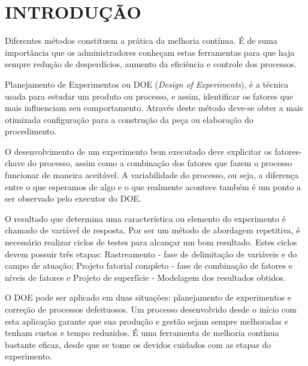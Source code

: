 \chapter{INTRODUÇÃO}
    Diferentes métodos constituem a prática da melhoria contínua. É de suma importância que os administradores conheçam estas ferramentas para que haja sempre redução de desperdícios, aumento da eficiência e controle dos processos.\cite{entenda_doe}

    Planejamento de Experimentos ou DOE (\textit{Design of Experiments}), é a técnica usada para estudar um produto ou processo, e assim, identificar os fatores que mais influenciam seu comportamento. Através deste método deve-se obter a mais otimizada configuração para a construção da peça ou elaboração do procedimento.\cite{oquee_doe}

    O desenvolvimento de um experimento bem executado deve explicitar os fatores-chave do processo, assim como a combinação dos fatores que fazem o processo funcionar de maneira aceitável. A variabilidade do processo, ou seja, a diferença entre o que esperamos de algo e o que realmente acontece também é um ponto a ser observado pelo executor do DOE.

    O resultado que determina uma característica ou elemento do experimento é chamado de variável de resposta. Por ser um método de abordagem repetitiva, é necessário realizar ciclos de testes para alcançar um bom resultado. Estes ciclos devem possuir três etapas: Rastreamento - fase de delimitação de variáveis e do campo de atuação; Projeto fatorial completo - fase de combinação de fatores e níveis de fatores e Projeto de superfície - Modelagem dos resultados obtidos.   

    O DOE pode ser aplicado em duas situações: planejamento de experimentos e correção de processos defeituosos. Um processo desenvolvido desde o início com esta aplicação garante que sua produção e gestão sejam sempre melhoradas e tenham custos e tempo reduzidos. É uma ferramenta de melhoria contínua bastante eficaz, desde que se tome os devidos cuidados com as etapas do experimento. \cite{oquee_doe}


    
    
    


